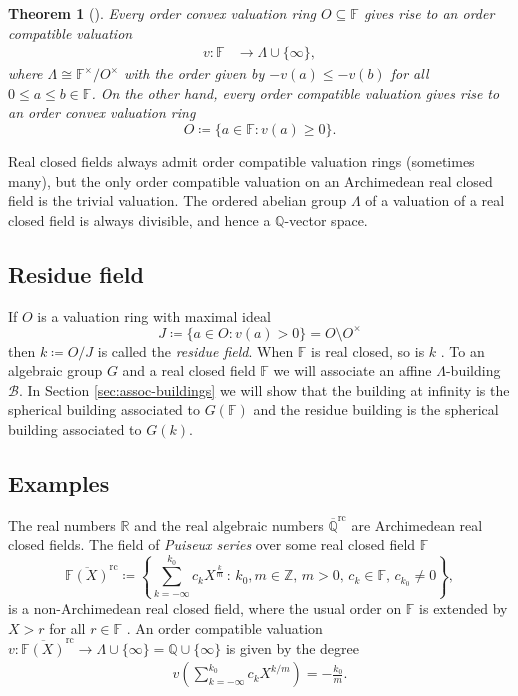 \documentclass[12pt]{amsart}
\newcommand{\F}{\mathbb{F} }
\newcommand{\R}{\mathbb{R} }
\newcommand{\Q}{\mathbb{Q} }
\numberwithin{equation}{section}
\newtheorem{theorem}{Theorem}[section]
\theoremstyle{remark} %
\begin{document}
 \begin{theorem}[\cite{Kru}]
 	Every order convex valuation ring $O\subseteq \F$ gives rise to an order compatible valuation
 	\begin{align*}
 		v \colon \F & \to \Lambda \cup \{\infty\},
 	\end{align*}
 	where $\Lambda \cong \F^\times/O^\times$ with the order given by $-v(a) \leq -v(b)$ for all $0 \leq a \leq b \in \F$. On the other hand, every order compatible valuation gives rise to an order convex valuation ring
 	$$
 	O \coloneqq \{ a \in \F \colon v(a)\geq 0\}.
 	$$
 \end{theorem}
 
 Real closed fields always admit order compatible valuation rings (sometimes many), but the only order compatible valuation on an Archimedean real closed field is the trivial valuation. The ordered abelian group $\Lambda$ of a valuation of a real closed field is always divisible, and hence a $\Q$-vector space.
 
 
 \subsection{Residue field}\label{sec:residue_field}
 
 If $O$ is a valuation ring with maximal ideal 
 $$
 J\coloneqq \{a \in O \colon v(a) > 0\} = O \setminus O^{\times}
 $$
 then $k \coloneqq  O/J$ is called the \emph{residue field}. When $\mathbb{F}$ is real closed, so is $k$ \cite[Theorem 4.3.7]{EnPr05}. To an algebraic group $G$ and a real closed field $\F$ we will associate an affine $\Lambda$-building $\mathcal{B}$. In Section \ref{sec:assoc-buildings} we will show that the building at infinity is the spherical building associated to $G(\F)$ and the residue building is the spherical building associated to $G(k)$.
 
 
 \subsection{Examples}\label{sec:real_closed_fields_examples}
 The real numbers $\R$ and the real algebraic numbers $\overline{\Q}^{\operatorname{rc}}$ are Archimedean real closed fields.
 The field of \emph{Puiseux series} over some real closed field $\F$
 $$
 \overline{\F(X)}^{\operatorname{rc}}  \coloneqq \left\{  \sum_{k=-\infty}^{k_0} c_k X^{\frac{k}{m}} \, \colon \, k_0, m \in \mathbb{Z}, \, m > 0 , \, c_k \in \F, \, c_{k_0}\neq 0\right\},
 $$ 
 is a non-Archimedean real closed field, where the usual order on $\F$ is extended by $X>r$ for all $r \in \F$ \cite{BCR}. An order compatible valuation $v \colon \overline{\F(X)}^{\operatorname{rc}} \to \Lambda\cup \{\infty\} =  \Q\cup \{\infty\}$ is given by the degree
 \begin{align*}
 	v\left(  \sum_{k=-\infty}^{k_0} c_k X^{k/m}\right)  =-\frac{k_0}{m}.
 \end{align*} 
 
\end{document}
